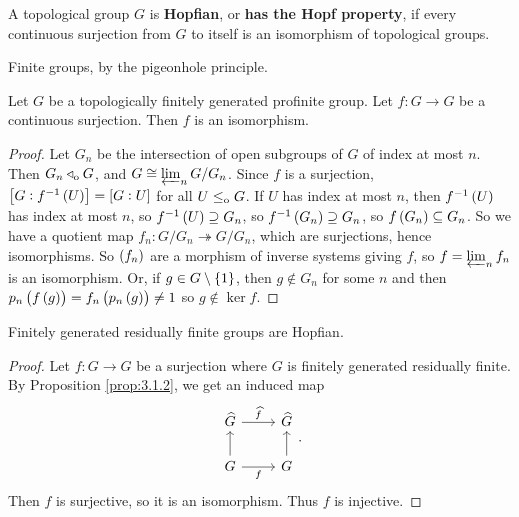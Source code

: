 \begin{definition}
A topological group $ G $ is \textbf{Hopfian}, or \textbf{has the Hopf property}, if every continuous surjection from $ G $ to itself is an isomorphism of topological groups.
\end{definition}

\begin{example}
Finite groups, by the pigeonhole principle.
\end{example}

\begin{proposition}
Let $ G $ be a topologically finitely generated profinite group. Let $ f : G \to G $ be a continuous surjection. Then $ f $ is an isomorphism.
\end{proposition}

\begin{proof}
Let $ G_n $ be the intersection of open subgroups of $ G $ of index at most $ n $. Then $ G_n \triangleleft_{\mathrm{o}} G $, and $ G \cong \varprojlim_n G / G_n $. Since $ f $ is a surjection, $ \sbr{G : f^{-1}\br{U}} = \sbr{G : U} $ for all $ U \le_{\mathrm{o}} G $. If $ U $ has index at most $ n $, then $ f^{-1}\br{U} $ has index at most $ n $, so $ f^{-1}\br{U} \supseteq G_n $, so $ f^{-1}\br{G_n} \supseteq G_n $, so $ f\br{G_n} \subseteq G_n $. So we have a quotient map $ f_n : G / G_n \twoheadrightarrow G / G_n $, which are surjections, hence isomorphisms. So $ \br{f_n} $ are a morphism of inverse systems giving $ f $, so $ f = \varprojlim_n f_n $ is an isomorphism. Or, if $ g \in G \setminus \cbr{1} $, then $ g \notin G_n $ for some $ n $ and then $ p_n\br{f\br{g}} = f_n\br{p_n\br{g}} \ne 1 $ so $ g \notin \ker f $.
\end{proof}

\begin{corollary}
Finitely generated residually finite groups are Hopfian.
\end{corollary}

\begin{proof}
Let $ f : G \to G $ be a surjection where $ G $ is finitely generated residually finite. By Proposition \ref{prop:3.1.2}, we get an induced map
$$
\begin{tikzcd}
\widehat{G} \arrow{r}{\widehat{f}} & \widehat{G} \\
G \arrow{u} \arrow{r}[swap]{f} & G \arrow{u}
\end{tikzcd}.
$$
Then $ \widehat{f} $ is surjective, so it is an isomorphism. Thus $ f $ is injective.
\end{proof}

